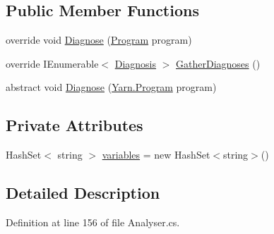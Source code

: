\subsection*{Public Member Functions}
\begin{DoxyCompactItemize}
\item 
override void \hyperlink{a00189_a980f0e64bc5ad171c35ec19bdf838b5c}{Diagnose} (\hyperlink{a00152}{Program} program)
\item 
override I\-Enumerable$<$ \hyperlink{a00091}{Diagnosis} $>$ \hyperlink{a00189_ab84e7a8e68740379dee12a51dca69b07}{Gather\-Diagnoses} ()
\item 
abstract void \hyperlink{a00053_aba4a36cb823b11ee491074e26477d084}{Diagnose} (\hyperlink{a00152}{Yarn.\-Program} program)
\end{DoxyCompactItemize}
\subsection*{Private Attributes}
\begin{DoxyCompactItemize}
\item 
Hash\-Set$<$ string $>$ \hyperlink{a00189_a64ed6c3394c474b6cf5804a35f560746}{variables} = new Hash\-Set$<$string$>$()
\end{DoxyCompactItemize}


\subsection{Detailed Description}


Definition at line 156 of file Analyser.\-cs.



